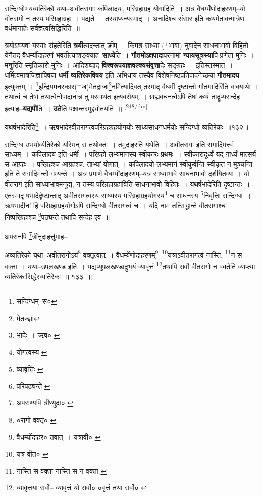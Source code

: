 \documentclass[article,12pt,a4paper]{memoir}
\newcommand{\add}[1]{($^{+}$#1)}
\begin{document}
	सन्दिग्धोभयव्यतिरेको यथा--अवीतरागाः कपिलादयः, परिग्रहाग्रह योगादिति । अत्र वैधर्म्येणोदाहरणम्--यो वीतरागो न तस्य परिग्रहाग्रहः । पद्यते । तस्याप्यन्यस्माद् । अनादिश्च संसार इति कथमेतावन्मात्रेण वर्धमानाहेः सर्वज्ञत्वसिद्धिरिति ॥
	\pend
      

	  \pstart त्रयोऽवयवा यस्याः संहतेरिति \textbf{त्रयी}त्यदन्तात् ङीप् । किमत्र साध्या \add{भावा} नुवादेन साधनाभावो विहितो येनैतद् वैधर्म्योदाहरणं भवतीत्याशङ्क्याह--\textbf{साध्ये}ति । \textbf{गौतमोऽक्षपादा}परनामा \textbf{न्यायसूत्रस्या}पि प्रणेता मुनिः । \textbf{मनु}रिति स्मृतिकारो मुनिः । आदिशब्दाद् \textbf{विश्वरूपयाज्ञवल्क्यसंवृत्ता}देः सङ्ग्रहः । इतिस्तस्मात् । धर्मित्वमात्रजिज्ञापिषया \textbf{धर्मी व्यतिरेकविषय} इति अभिधाय तस्यैव विशेषनिष्ठप्रतिपादनेच्छया \textbf{गौतमादय} इत्युक्तम् । \footnote{सन्दिग्धम्--स०}इन्द्रियमनस्कार\add{ज}मेतद्राजा\footnote{मेतज्ज्ञा}नमित्यादिवत् तस्माद् वैधर्मी दृष्टान्तो गौतमादिरिति वाक्यार्थः । तथात्वं च तेषां तथात्वेनोपादानान्न तु परमार्थत इत्यवसेयम् । ग्राह्यवचनत्वेऽपि तेषां कथं ताद्रूप्यसन्देह इत्याह--\textbf{यद्यपी}ति । \textbf{उते}ति पक्षान्तरमुद्द्योतयति ॥
	\pend
      \leavevmode\textsuperscript{\rmlatinfont\tiny [248/dm]}

	  \pstart यथर्षभादेरिति\footnote{भादेः । ऋष० \cite{dp-msC}} । ऋषभादेरवीतरागत्वपरिग्रहग्रहयोगयोः साध्यसाधनधर्मयोः सन्दिग्धो व्यतिरेकः ॥१३२॥
	\pend
       

	  \pstart सन्दिग्ध उभयोर्व्यतिरेको यस्मिन् स तथोक्तः । तमुदाहरति यथेति । अवीतरागा इति रागादिमत्त्वं साध्यम् । कपिलादय इति धर्मी । परिग्रहो लभ्यमानस्य स्वीकारः प्रथमः । स्वीकारादूर्ध्वं यद् गार्ध्यं मात्सर्यं स आग्रहः । परिग्रहश्च आग्रहश्च, ताभ्यां योगात् । कपिलादयो लभ्यमानं स्वीकुर्वन्ति स्वीकृतं न मुञ्चन्ति--इति ते रागादिमन्तो गम्यन्ते । अत्र प्रमाणे वैधर्म्योदाहरणम्--यत्र साध्याभावे साधनाभावो दर्शयितव्यः । यो वीतराग इति साध्याभावमनूद्य, न तस्य परिग्रहाग्रहाविति साधनाभावो विहितः । यथर्षभादेरिति दृष्टान्तः । एतस्मादृ षभादेर्दृष्टान्ताद् अवीतरागत्वस्य साध्यस्य परिग्रहाग्रहयोगस्य\footnote{योगत्वस्य \cite{dp-msA}} च साधनस्य \footnote{व्यावृत्तिः \cite{dp-msC} \cite{dp-edE}}निवृत्तिः सन्दिग्धा । ऋषभादीनां हि परिग्रहाग्रहयोगोऽपि सन्दिग्धो वीतरागत्वं च । यदि नाम तत्सिद्धान्ते वीतरागाश्च निष्परिग्रहाश्च \footnote{परिपठ्यन्ते \cite{dp-msD}}पठ्यन्ते तथापि सन्देह एव ॥
	\pend
       

	  \pstart अपरानपि \footnote{अपराण्यपि त्रीण्युदा० \cite{dp-msD}}त्रीनुदाहर्त्तुमाह--
	\pend
       

	  \pstart अव्यतिरेको यथा--अवीतरागोऽयं\footnote{०रागो वक्तृ० \cite{dp-msD} \cite{dp-msB} \cite{dp-edP} \cite{dp-edH} \cite{dp-edE} \cite{dp-edN}} वक्तृत्वात् । वैधर्म्येणोदाहरणम्\footnote{वैधर्म्योदाहर० \cite{dp-msB} \cite{dp-edP} \cite{dp-edH} \cite{dp-edE} \cite{dp-edN} तवात् । यत्रावी० \cite{dp-msC}}--\footnote{यत्र वीत० \cite{dp-msB} \cite{dp-edP} \cite{dp-edH} \cite{dp-edE}}यत्राऽवीतरागत्वं नास्ति, \footnote{नास्ति स वक्ता \cite{dp-msB} \cite{dp-edP} \cite{dp-edH} \cite{dp-edE} नास्ति स न वक्ता \cite{dp-msC}}न स वक्ता । यथा--उपलखण्ड इति । यद्यप्युपलखण्डादुभयं व्यावृत्तं \footnote{व्यावृत्तया सर्वो--\cite{dp-msB} \cite{dp-edP} \cite{dp-edH} व्यावृत्तं यो सर्वो० \cite{dp-edE} ०वृत्तं तथा सर्वो० \cite{dp-msC}}तथापि सर्वो वीतरागो न वक्तेति व्याप्त्या व्यतिरेकासिद्धेरव्यतिरेकः ॥ १३३ ॥
	\pend
      
\end{document}
